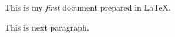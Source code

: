 \documentclass{article}
\begin{document}
This is my \emph{first} document prepared in \LaTeX.

This is next paragraph.
\end{document}
